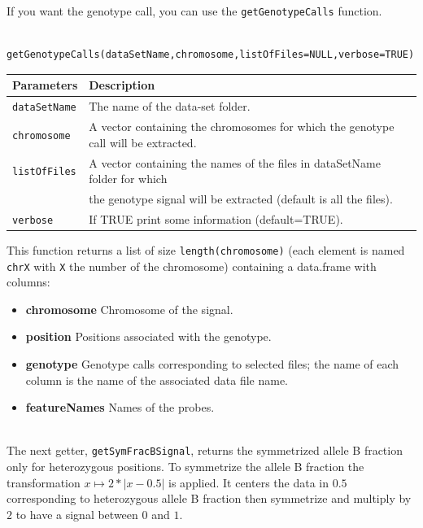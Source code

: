 \documentclass[a4paper,10pt]{article}
\begin{document}
		If you want the genotype call, you can use the \texttt{getGenotypeCalls} function. 
		
		\begin{verbatim}	
		getGenotypeCalls(dataSetName,chromosome,listOfFiles=NULL,verbose=TRUE)
		\end{verbatim}
	
		\begin{center}
			\begin{tabular}{|l|l|}
				\hline
				Parameters & Description\\
				\hline
				\texttt{dataSetName} & The name of the data-set folder.\\
				\texttt{chromosome} &  A vector containing the chromosomes for which the genotype call will be extracted.\\
				\texttt{listOfFiles} & A vector containing the names of the files in dataSetName folder for which\\
				~ & the genotype signal will be extracted (default is all the files).\\
				\texttt{verbose} & If TRUE print some information (default=TRUE).\\
				\hline	
			\end{tabular}		
		\end{center}
				
		This function returns a list of size \texttt{length(chromosome)} (each element is named \texttt{chrX} with \texttt{X} the number of the chromosome) containing a data.frame with columns:
		\begin{itemize}
			\item \textbf{chromosome} Chromosome of the signal.
			\item \textbf{position} Positions associated with the genotype.
			\item \textbf{genotype} Genotype calls corresponding to selected files; the name of each column is the name of the associated data file name. 
			\item \textbf{featureNames} Names of the probes.
		\end{itemize}
		
		
		~~\\
		The next getter, \texttt{getSymFracBSignal}, returns the symmetrized allele B fraction only for heterozygous positions. To symmetrize the allele B fraction the transformation $x\mapsto 2*|x-0.5|$ is applied. It centers the data in $0.5$ corresponding to heterozygous allele B fraction then symmetrize and multiply by $2$ to have a signal between $0$ and $1$. \\
    
\end{document}
